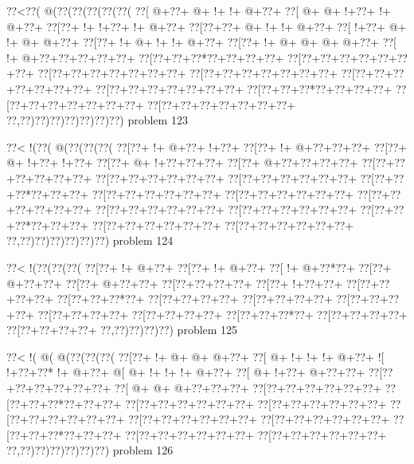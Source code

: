 \vbox{\vbox{\goo
\0??<\0??(\- @(\0??(\0??(\0??(\0??(\0??(
\0??[\- @+\0??+\- @+\- !+\- !+\- @+\0??+
\0??[\- @+\- @+\- !+\0??+\- !+\- @+\0??+
\0??[\0??+\- !+\- !+\0??+\- !+\- @+\0??+
\0??[\0??+\0??+\- @+\- !+\- !+\- @+\0??+
\0??[\- !+\0??+\- @+\- !+\- @+\- @+\0??+
\0??[\0??+\- !+\- @+\- !+\- !+\- @+\0??+
\0??[\0??+\- !+\- @+\- @+\- @+\- @+\0??+
\0??[\- !+\- @+\0??+\0??+\0??+\0??+\0??+
\0??[\0??+\0??+\0??*\0??+\0??+\0??+\0??+
\0??[\0??+\0??+\0??+\0??+\0??+\0??+\0??+
\0??[\0??+\0??+\0??+\0??+\0??+\0??+\0??+
\0??[\0??+\0??+\0??+\0??+\0??+\0??+\0??+
\0??[\0??+\0??+\0??+\0??+\0??+\0??+\0??+
\0??[\0??+\0??+\0??+\0??+\0??+\0??+\0??+
\0??[\0??+\0??+\0??*\0??+\0??+\0??+\0??+
\0??[\0??+\0??+\0??+\0??+\0??+\0??+\0??+
\0??[\0??+\0??+\0??+\0??+\0??+\0??+\0??+
\0??,\0??)\0??)\0??)\0??)\0??)\0??)\0??)
}
\hfil problem 123\hfil\break
}

\vbox{\vbox{\goo
\0??<\- !(\0??(\- @(\0??(\0??(\0??(
\0??[\0??+\- !+\- @+\0??+\- !+\0??+
\0??[\0??+\- !+\- @+\0??+\0??+\0??+
\0??[\0??+\- @+\- !+\0??+\- !+\0??+
\0??[\0??+\- @+\- !+\0??+\0??+\0??+
\0??[\0??+\- @+\0??+\0??+\0??+\0??+
\0??[\0??+\0??+\0??+\0??+\0??+\0??+
\0??[\0??+\0??+\0??+\0??+\0??+\0??+
\0??[\0??+\0??+\0??+\0??+\0??+\0??+
\0??[\0??+\0??+\0??*\0??+\0??+\0??+
\0??[\0??+\0??+\0??+\0??+\0??+\0??+
\0??[\0??+\0??+\0??+\0??+\0??+\0??+
\0??[\0??+\0??+\0??+\0??+\0??+\0??+
\0??[\0??+\0??+\0??+\0??+\0??+\0??+
\0??[\0??+\0??+\0??+\0??+\0??+\0??+
\0??[\0??+\0??+\0??*\0??+\0??+\0??+
\0??[\0??+\0??+\0??+\0??+\0??+\0??+
\0??[\0??+\0??+\0??+\0??+\0??+\0??+
\0??,\0??)\0??)\0??)\0??)\0??)\0??)
}
\hfil problem 124\hfil\break
}

\vbox{\vbox{\goo
\0??<\- !(\0??(\0??(\0??(
\0??[\0??+\- !+\- @+\0??+
\0??[\0??+\- !+\- @+\0??+
\0??[\- !+\- @+\0??*\0??+
\0??[\0??+\- @+\0??+\0??+
\0??[\0??+\- @+\0??+\0??+
\0??[\0??+\0??+\0??+\0??+
\0??[\0??+\- !+\0??+\0??+
\0??[\0??+\0??+\0??+\0??+
\0??[\0??+\0??+\0??*\0??+
\0??[\0??+\0??+\0??+\0??+
\0??[\0??+\0??+\0??+\0??+
\0??[\0??+\0??+\0??+\0??+
\0??[\0??+\0??+\0??+\0??+
\0??[\0??+\0??+\0??+\0??+
\0??[\0??+\0??+\0??*\0??+
\0??[\0??+\0??+\0??+\0??+
\0??[\0??+\0??+\0??+\0??+
\0??,\0??)\0??)\0??)\0??)
}
\hfil problem 125\hfil\break
}

\vbox{\vbox{\goo
\0??<\- !(\- @(\- @(\0??(\0??(\0??(
\0??[\0??+\- !+\- @+\- @+\- @+\0??+
\0??[\- @+\- !+\- !+\- !+\- @+\0??+
\- ![\- !+\0??+\0??*\- !+\- @+\0??+
\- @[\- @+\- !+\- !+\- !+\- @+\0??+
\0??[\- @+\- !+\0??+\- @+\0??+\0??+
\0??[\0??+\0??+\0??+\0??+\0??+\0??+
\0??[\- @+\- @+\- @+\0??+\0??+\0??+
\0??[\0??+\0??+\0??+\0??+\0??+\0??+
\0??[\0??+\0??+\0??*\0??+\0??+\0??+
\0??[\0??+\0??+\0??+\0??+\0??+\0??+
\0??[\0??+\0??+\0??+\0??+\0??+\0??+
\0??[\0??+\0??+\0??+\0??+\0??+\0??+
\0??[\0??+\0??+\0??+\0??+\0??+\0??+
\0??[\0??+\0??+\0??+\0??+\0??+\0??+
\0??[\0??+\0??+\0??*\0??+\0??+\0??+
\0??[\0??+\0??+\0??+\0??+\0??+\0??+
\0??[\0??+\0??+\0??+\0??+\0??+\0??+
\0??,\0??)\0??)\0??)\0??)\0??)\0??)
}
\hfil problem 126\hfil\break
}

